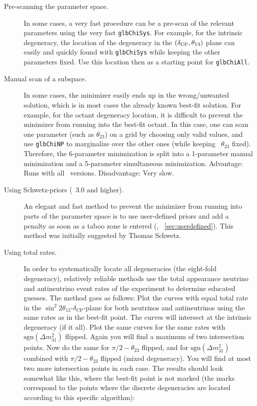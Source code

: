 \begin{description}
\item[Pre-scanning the parameter space.] In some cases, a very fast procedure can be a pre-scan 
of the relevant parameters using the very fast {\tt glbChiSys}. For example, for the intrinsic degeneracy, the location of the degeneracy in the $(\delta_{\mathrm{CP}},\theta_{13})$ plane can easily and quickly found with {\tt glbChiSys} while keeping the other parameters fixed. Use this location then as a starting point for {\tt glbChiAll}.
\item[Manual scan of a subspace.] In some cases, the minimizer easily ends up in the wrong/unwanted solution, which is in most cases the already known best-fit solution. For example, for the octant degeneracy location, it is difficult to prevent the minimizer from running into the best-fit octant. In this case, one can scan one parameter (such as $\theta_{23}$) on a grid by choosing only valid values, and use {\tt glbChiNP} to marginalize over the other ones (while keeping \eg\ $\theta_{23}$ fixed). Therefore, the 6-parameter minimization is split into a 1-parameter manual minimization and a 5-parameter simultaneous minimization. Advantage: Runs with all \GLOBES\ versions. Disadvantage: Very slow. 
\item[Using Schwetz-priors (\GLOBES\ 3.0 and higher).] An elegant and fast method to prevent the minimizer from running into parts of the parameter space is to use user-defined priors and add a penalty as soon as a taboo zone is entered (\cf, \Sec~\ref{sec:userdefined}). This method was initially suggested by Thomas Schwetz.
\item[Using total rates.] In order to systematically locate all degeneracies (the eight-fold degeneracy), relatively reliable methods use the total appearance neutrino and antineutrino event rates of the experiment to determine educated guesses. The method goes as follows: Plot the curves with equal total rate in the $\sin^2 2 \theta_{13}$-$\delta_{\mathrm{CP}}$-plane for both neutrinos and antineutrinos using the same rates as in the best-fit point. The curves will intersect at the intrinsic degeneracy (if it all). Plot the same curves for the same rates with $\mathrm{sgn}(\Delta m_{31}^2)$ flipped. Again you will find a maximum of two intersection points. Now do the same for $\pi/2 - \theta_{23}$ flipped, and for  $\mathrm{sgn}(\Delta m_{31}^2)$ combined with $\pi/2 - \theta_{23}$ flipped (mixed degeneracy). You will find at most two more intersection points in each case.
The results should look somewhat like this, where the best-fit point is not marked (the marks correspond to the points where the discrete degeneracies are located according to this specific algorithm):

\end{description}
